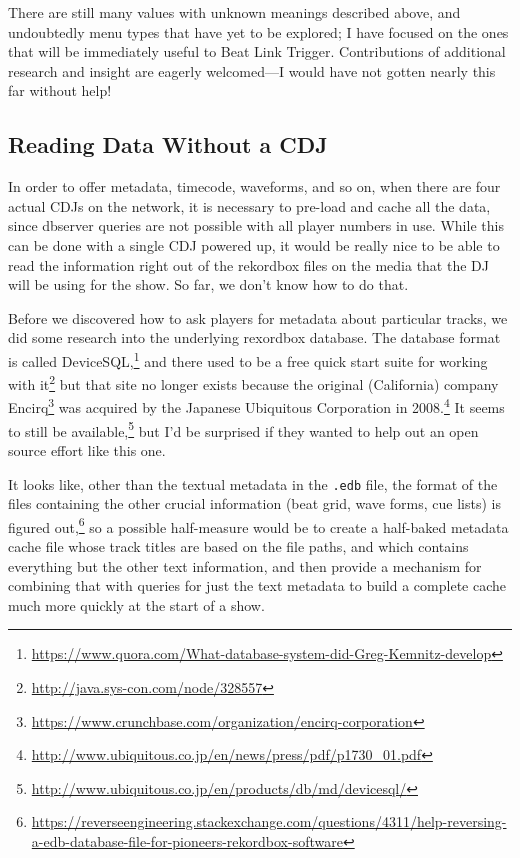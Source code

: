 \documentclass[11pt]{article}
\begin{document}
There are still many values with unknown meanings described above, and
undoubtedly menu types that have yet to be explored; I have focused on
the ones that will be immediately useful to Beat Link Trigger.
Contributions of additional research and insight are eagerly
welcomed---I would have not gotten nearly this far without help!

\subsection{Reading Data Without a CDJ}

In order to offer metadata, timecode, waveforms, and so on, when there
are four actual CDJs on the network, it is necessary to pre-load and
cache all the data, since dbserver queries are not possible with all
player numbers in use. While this can be done with a single CDJ
powered up, it would be really nice to be able to read the information
right out of the rekordbox files on the media that the DJ will be
using for the show. So far, we don't know how to do that.

Before we discovered how to ask players for metadata about
particular tracks, we did some research into the underlying rexordbox
database. The database format is called
DeviceSQL,\footnote{\url{https://www.quora.com/What-database-system-did-Greg-Kemnitz-develop}}
and there used to be a free quick start suite for working with
it\footnote{\url{http://java.sys-con.com/node/328557}} but that site
no longer exists because the original (California) company
Encirq\footnote{\url{https://www.crunchbase.com/organization/encirq-corporation}}
was acquired by the Japanese Ubiquitous Corporation in
2008.\footnote{\url{http://www.ubiquitous.co.jp/en/news/press/pdf/p1730_01.pdf}}
It seems to still be
available,\footnote{\url{http://www.ubiquitous.co.jp/en/products/db/md/devicesql/}}
but I'd be surprised if they wanted to help out an open source effort
like this one.

It looks like, other than the textual metadata in the {\tt .edb} file,
the format of the files containing the other crucial information (beat
grid, wave forms, cue lists) is figured
out,\footnote{\url{https://reverseengineering.stackexchange.com/questions/4311/help-reversing-a-edb-database-file-for-pioneers-rekordbox-software}}
so a possible half-measure would be to create a half-baked metadata
cache file whose track titles are based on the file paths, and which
contains everything but the other text information, and then provide a
mechanism for combining that with queries for just the text metadata
to build a complete cache much more quickly at the start of a show.
\end{document}
